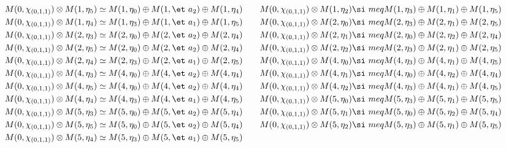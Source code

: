 \begin{align*}
M(0,\chi_{(0,1,1)}) &\otimes M(1,\eta_{5}) \simeq M(1,\eta_{0}) \oplus M(1,\et\
a_{2}) \oplus M(1,\eta_{4}) &&& M(0,\chi_{(0,1,1)}) &\otimes M(1,\eta_{2}) \si\
meq M(1,\eta_{3}) \oplus M(1,\eta_{1}) \oplus M(1,\eta_{5})\\
M(0,\chi_{(0,1,1)}) &\otimes M(1,\eta_{4}) \simeq M(1,\eta_{3}) \oplus M(1,\et\
a_{1}) \oplus M(1,\eta_{5}) &&& M(0,\chi_{(0,1,1)}) &\otimes M(2,\eta_{0}) \si\
meq M(2,\eta_{3}) \oplus M(2,\eta_{1}) \oplus M(2,\eta_{5})\\
M(0,\chi_{(0,1,1)}) &\otimes M(2,\eta_{3}) \simeq M(2,\eta_{0}) \oplus M(2,\et\
a_{2}) \oplus M(2,\eta_{4}) &&& M(0,\chi_{(0,1,1)}) &\otimes M(2,\eta_{1}) \si\
meq M(2,\eta_{0}) \oplus M(2,\eta_{2}) \oplus M(2,\eta_{4})\\
M(0,\chi_{(0,1,1)}) &\otimes M(2,\eta_{5}) \simeq M(2,\eta_{0}) \oplus M(2,\et\
a_{2}) \oplus M(2,\eta_{4}) &&& M(0,\chi_{(0,1,1)}) &\otimes M(2,\eta_{2}) \si\
meq M(2,\eta_{3}) \oplus M(2,\eta_{1}) \oplus M(2,\eta_{5})\\
M(0,\chi_{(0,1,1)}) &\otimes M(2,\eta_{4}) \simeq M(2,\eta_{3}) \oplus M(2,\et\
a_{1}) \oplus M(2,\eta_{5}) &&& M(0,\chi_{(0,1,1)}) &\otimes M(4,\eta_{0}) \si\
meq M(4,\eta_{3}) \oplus M(4,\eta_{1}) \oplus M(4,\eta_{5})\\
M(0,\chi_{(0,1,1)}) &\otimes M(4,\eta_{3}) \simeq M(4,\eta_{0}) \oplus M(4,\et\
a_{2}) \oplus M(4,\eta_{4}) &&& M(0,\chi_{(0,1,1)}) &\otimes M(4,\eta_{1}) \si\
meq M(4,\eta_{0}) \oplus M(4,\eta_{2}) \oplus M(4,\eta_{4})\\
M(0,\chi_{(0,1,1)}) &\otimes M(4,\eta_{5}) \simeq M(4,\eta_{0}) \oplus M(4,\et\
a_{2}) \oplus M(4,\eta_{4}) &&& M(0,\chi_{(0,1,1)}) &\otimes M(4,\eta_{2}) \si\
meq M(4,\eta_{3}) \oplus M(4,\eta_{1}) \oplus M(4,\eta_{5})\\
M(0,\chi_{(0,1,1)}) &\otimes M(4,\eta_{4}) \simeq M(4,\eta_{3}) \oplus M(4,\et\
a_{1}) \oplus M(4,\eta_{5}) &&& M(0,\chi_{(0,1,1)}) &\otimes M(5,\eta_{0}) \si\
meq M(5,\eta_{3}) \oplus M(5,\eta_{1}) \oplus M(5,\eta_{5})\\
M(0,\chi_{(0,1,1)}) &\otimes M(5,\eta_{3}) \simeq M(5,\eta_{0}) \oplus M(5,\et\
a_{2}) \oplus M(5,\eta_{4}) &&& M(0,\chi_{(0,1,1)}) &\otimes M(5,\eta_{1}) \si\
meq M(5,\eta_{0}) \oplus M(5,\eta_{2}) \oplus M(5,\eta_{4})\\
M(0,\chi_{(0,1,1)}) &\otimes M(5,\eta_{5}) \simeq M(5,\eta_{0}) \oplus M(5,\et\
a_{2}) \oplus M(5,\eta_{4}) &&& M(0,\chi_{(0,1,1)}) &\otimes M(5,\eta_{2}) \si\
meq M(5,\eta_{3}) \oplus M(5,\eta_{1}) \oplus M(5,\eta_{5})\\
M(0,\chi_{(0,1,1)}) &\otimes M(5,\eta_{4}) \simeq M(5,\eta_{3}) \oplus M(5,\et\
a_{1}) \oplus M(5,\eta_{5})\\
\end{align*}

